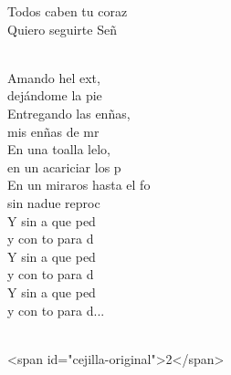 \documentclass[12pt]{article}
\begin{document}
\begin{multicols*}{2}
\begin{cancion}
            Todos caben  tu coraz\\
            Quiero seguirte Señ\\\jump\\
            \begin{chorus}%
            Amando hel ext, \\
            dejándome la pie\\
            Entregando las enñas, \\
            mis enñas de mr\\
            En una toalla lelo, \\
            en un acariciar los p\\
            En un miraros hasta el fo \\
            sin nadue reproc\\
            Y sin a que ped\\
            y con to para d\\
            Y sin a que ped\\
            y con to para d\\
            Y sin a que ped\\
            y con to para d...\\
            \end{chorus}%
            \jump\\
        <span id="cejilla-original">2</span>\\
        \end{cancion}%
        

\end{multicols*}
\end{document}
